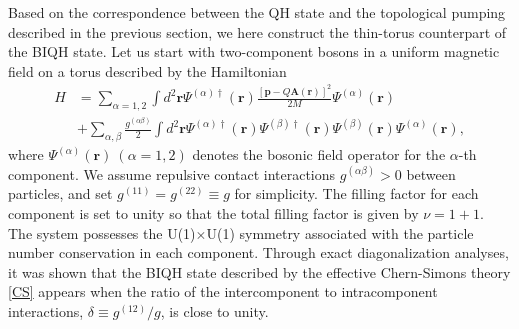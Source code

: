 \documentclass[aps,prb,twocolumn,superscriptaddress,showpacs,floatfix]{revtex4-1}
\newcommand{\bmr}{\bm{r}}
\begin{document}
Based on the correspondence between the QH state and the topological pumping described in the previous section, we here construct the thin-torus counterpart of the BIQH state. Let us start with two-component bosons in a uniform magnetic field on a torus described by the Hamiltonian 
\begin{equation}\label{Hamil}
\begin{split}
H&=\sum_{\alpha=1,2}\int d^2\bmr\Psi^{(\alpha)\dag}(\bmr)\frac{[\bm{p}-Q\bm{A}(\bmr)]^2}{2M}\Psi^{(\alpha)}(\bmr)\\
&+\sum_{\alpha,\beta}\frac{g^{(\alpha\beta)}}{2}\int d^2\bmr \Psi^{(\alpha)\dag}(\bmr)\Psi^{(\beta)\dag}(\bmr)\Psi^{(\beta)}(\bmr)\Psi^{(\alpha)}(\bmr),
\end{split}
\end{equation}
where $\Psi^{(\alpha)}(\bmr)\ (\alpha=1,2)$ denotes the bosonic field operator for the $\alpha$-th component. 
We assume repulsive contact interactions $g^{(\alpha\beta)}>0$ between particles, and set $g^{(11)}=g^{(22)}\equiv g$ for simplicity. 
The filling factor for each component is set to unity so that the total filling factor is given by $\nu=1+1$. 
The system possesses the U(1)$\times$U(1) symmetry associated with the particle number conservation in each component. 
Through exact diagonalization analyses,\cite{FurukawaUeda, WuJain, RegnaultSenthil} it was shown that the BIQH state described by the effective Chern-Simons theory \eqref{CS} appears when the ratio of the intercomponent to intracomponent interactions, $\delta\equiv g^{(12)}/g$, is close to unity. 
\end{document}
